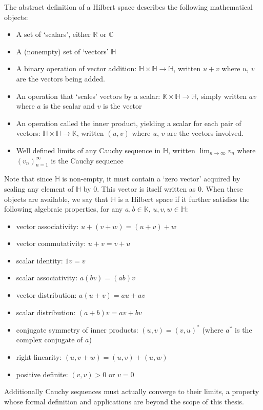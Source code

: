 The abstract definition of a Hilbert space describes the following mathematical objects:
\begin{itemize}
	\item A set of `scalars', either $\mathbb{R}$ or $\mathbb{C}$
	\item A (nonempty) set of `vectors' $\mathbb{H}$
	\item A binary operation of vector addition: $\mathbb{H} \times \mathbb{H} \to \mathbb{H}$, written $u + v$ where $u$, $v$ are the vectors being added.
	\item An operation that `scales' vectors by a scalar: $\mathbb{K} \times \mathbb{H} \to \mathbb{H}$, simply written $av$ where $a$ is the scalar and $v$ is the vector
	\item An operation called the inner product, yielding a scalar for each pair of vectors: $\mathbb{H} \times \mathbb{H} \to \mathbb{K}$, written $(u, v)$ where $u$, $v$ are the vectors involved.
	\item Well defined limits of any Cauchy sequence in $\mathbb{H}$, written $\lim_{n \to \infty} v_n$ where $(v_n)_{n=1}^\infty$ is the Cauchy sequence
\end{itemize}
Note that since $\mathbb{H}$ is non-empty, it must contain a `zero vector' acquired by scaling any element of $\mathbb{H}$ by 0. This vector is itself written as 0. When these objects are available, we say that $\mathbb{H}$ is a Hilbert space if it further satisfies the following algebraic properties, for any $a, b\in \mathbb{K}$, $u,v,w \in \mathbb{H}$:
\begin{itemize}
	\item vector associativity: $u + (v + w) = (u + v) + w$
	\item vector commutativity: $u + v = v + u$
	\item scalar identity: $1v = v$
	\item scalar associativity: $a(bv) = (ab)v$
	\item vector distribution: $a(u + v) = au + av$
	\item scalar distribution: $(a+b)v = av + bv$
	\item conjugate symmetry of inner products: $(u, v) = (v, u)^*$ (where $a^*$ is the complex conjugate of $a$)
	\item right linearity: $(u, v+w) = (u, v) + (u, w)$
	\item positive definite: $(v, v) > 0$ or $v = 0$
\end{itemize}
Additionally Cauchy sequences must actually converge to their limits, a property whose formal definition and applications are beyond the scope of this thesis.

